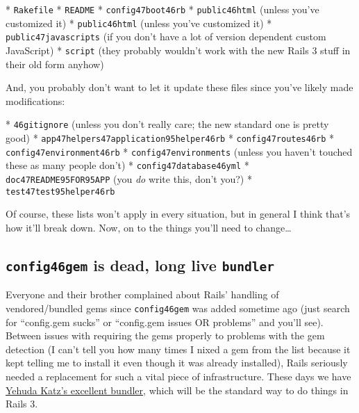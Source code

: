 \documentclass{book}
\begin{document}
* {\colorbox[rgb]{0.87,0.87,0.87}{\tt Rakefile}} * {\colorbox[rgb]{0.87,0.87,0.87}{\tt README}} * {\colorbox[rgb]{0.87,0.87,0.87}{\tt config\char47boot\char46rb}} * {\colorbox[rgb]{0.87,0.87,0.87}{\tt public\char46html}} (unless you'{}ve customized it) * {\colorbox[rgb]{0.87,0.87,0.87}{\tt public\char46html}} (unless you'{}ve customized it) * {\colorbox[rgb]{0.87,0.87,0.87}{\tt public\char47javascripts}} (if you don'{}t have a lot of version dependent custom JavaScript) * {\colorbox[rgb]{0.87,0.87,0.87}{\tt script}} (they probably wouldn'{}t work with the new Rails 3 stuff in their old form anyhow)

And, you probably don'{}t want to let it update these files since you'{}ve likely made modifications:

* {\colorbox[rgb]{0.87,0.87,0.87}{\tt \char46gitignore}} (unless you don'{}t really care; the new standard one is pretty good) * {\colorbox[rgb]{0.87,0.87,0.87}{\tt app\char47helpers\char47application\char95helper\char46rb}} * {\colorbox[rgb]{0.87,0.87,0.87}{\tt config\char47routes\char46rb}} * {\colorbox[rgb]{0.87,0.87,0.87}{\tt config\char47environment\char46rb}} * {\colorbox[rgb]{0.87,0.87,0.87}{\tt config\char47environments}} (unless you haven'{}t touched these as many people don'{}t) * {\colorbox[rgb]{0.87,0.87,0.87}{\tt config\char47database\char46yml}} * {\colorbox[rgb]{0.87,0.87,0.87}{\tt doc\char47README\char95FOR\char95APP}} (you \emph{do} write this, don'{}t you?) * {\colorbox[rgb]{0.87,0.87,0.87}{\tt test\char47test\char95helper\char46rb}}

Of course, these lists won'{}t apply in every situation, but in general I think that'{}s how it'{}ll break down. Now, on to the things you'{}ll need to change\ldots{}

\hypertarget{_is_dead_long_live_}{}\subsection*{{{\colorbox[rgb]{0.87,0.87,0.87}{\tt config\char46gem}} is dead, long live {\colorbox[rgb]{0.87,0.87,0.87}{\tt bundler}}}}\label{_is_dead_long_live_}

Everyone and their brother complained about Rails'{} handling of vendored/bundled gems since {\colorbox[rgb]{0.87,0.87,0.87}{\tt config\char46gem}} was added sometime ago (just search for ``{}config.gem sucks''{} or ``{}config.gem issues OR problems''{} and you'{}ll see). Between issues with requiring the gems properly to problems with the gem detection (I can'{}t tell you how many times I nixed a gem from the list because it kept telling me to install it even though it was already installed), Rails seriously needed a replacement for such a vital piece of infrastructure. These days we have \href{http://github.com/carlhuda/bundler}{Yehuda Katz'{}s excellent bundler}, which will be the standard way to do things in Rails 3.
\end{document}
